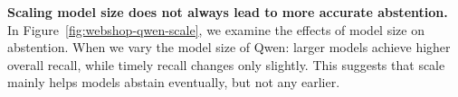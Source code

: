 \documentclass{article}
\begin{document}
\vspace{-1mm}
\textbf{Scaling model size does not always lead to more accurate abstention.} In Figure~\ref{fig:webshop-qwen-scale}, we examine the effects of model size on abstention. When we vary the model size of Qwen: larger models achieve higher overall recall, while timely recall changes only slightly. This suggests that scale mainly helps models abstain eventually, but not any earlier. 





















\end{document}
